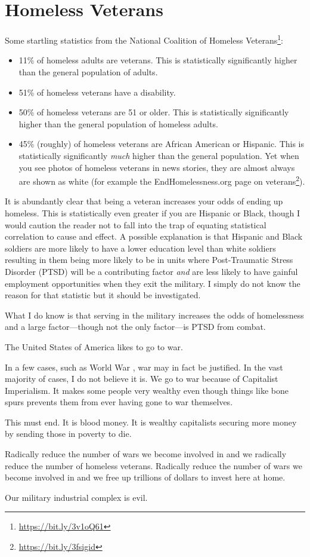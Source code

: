 \section{Homeless Veterans}

Some startling statistics from the National Coalition of Homeless Veterans\footnote{\url{https://bit.ly/3v1oQ61}}:

\begin{itemize}
  \item 11\% of homeless adults are veterans. This is statistically significantly higher than the general population of adults.
  \item 51\% of homeless veterans have a disability.
  \item 50\% of homeless veterans are 51 or older. This is statistically significantly higher than the general population of homeless adults.
  \item 45\% (roughly) of homeless veterans are African American or Hispanic. This is statistically significantly \emph{much} higher than the general population. Yet when you see photos of homeless veterans in news stories, they are almost always are shown as white (for example the EndHomelessness.org page on veterans\footnote{\url{https://bit.ly/3fsigid}}).
\end{itemize}

It is abundantly clear that being a veteran increases your odds of ending up homeless. This is statistically even greater if you are Hispanic or Black, though I would caution the reader not to fall into the trap of equating statistical correlation to cause and effect. A possible explanation is that Hispanic and Black soldiers are more likely to have a lower education level than white soldiers resulting in them being more likely to be in units where Post-Traumatic Stress Disorder (PTSD) will be a contributing factor \emph{and} are less likely to have gainful employment opportunities when they exit the military. I simply do not know the reason for that statistic but it should be investigated.

What I do know is that serving in the military increases the odds of homelessness and a large factor---though not the only factor---is PTSD from combat.

The United States of America likes to go to war.

In a few cases, such as World War , war may in fact be justified. In the vast majority of cases, I do not believe it is. We go to war because of Capitalist Imperialism. It makes some people very wealthy even though things like bone spurs prevents them from ever having gone to war themselves.

This must end. It is blood money. It is wealthy capitalists securing more money by sending those in poverty to die.

Radically reduce the number of wars we become involved in and we radically reduce the number of homeless veterans. Radically reduce the number of wars we become involved in and we free up trillions of dollars to invest here at home.

Our military industrial complex is evil.

